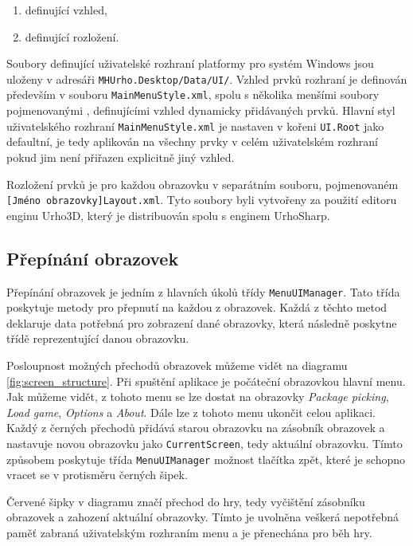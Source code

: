 \begin{enumerate}
	\item definující vzhled,
	\item definující rozložení.
\end{enumerate}

Soubory definující uživatelské rozhraní platformy pro systém Windows jsou uloženy v adresáři \texttt{MHUrho.Desktop/Data/UI/}.
Vzhled prvků rozhraní je definován především v souboru \texttt{MainMenuStyle.xml}, spolu s několika menšími soubory pojmenovanými , definujícími vzhled dynamicky přidávaných prvků. Hlavní styl uživatelského rozhraní \texttt{MainMenuStyle.xml} je nastaven v kořeni \texttt{UI.Root} jako defaultní, je tedy aplikován na všechny prvky v celém uživatelském rozhraní pokud jim není přiřazen explicitně jiný vzhled.

Rozložení prvků je pro každou obrazovku v separátním souboru, pojmenovaném \texttt{[Jméno obrazovky]Layout.xml}. Tyto soubory byli vytvořeny za použití editoru enginu Urho3D, který je distribuován spolu s enginem UrhoSharp. 

\subsection{Přepínání obrazovek}
Přepínání obrazovek je jedním z hlavních úkolů třídy \texttt{MenuUIManager}. Tato třída poskytuje metody pro přepnutí na každou z obrazovek. Každá z těchto metod deklaruje data potřebná pro zobrazení dané obrazovky, která následně poskytne třídě reprezentující danou obrazovku.

Posloupnost možných přechodů obrazovek můžeme vidět na diagramu \ref{fig:screen_structure}. Při spuštění aplikace je počáteční obrazovkou hlavní menu. Jak můžeme vidět, z tohoto menu se lze dostat na obrazovky \textit{Package picking}, \textit{Load game}, \textit{Options} a \textit{About}. Dále lze z tohoto menu ukončit celou aplikaci. Každý z černých přechodů přidává starou obrazovku na zásobník obrazovek a nastavuje novou obrazovku jako \texttt{CurrentScreen}, tedy aktuální obrazovku. Tímto způsobem poskytuje třída \texttt{MenuUIManager} možnost tlačítka zpět, které je schopno vracet se v protisměru černých šipek.

Červené šipky v diagramu značí přechod do hry, tedy vyčištění zásobníku obrazovek a zahození aktuální obrazovky. Tímto je uvolněna veškerá nepotřebná paměť zabraná uživatelským rozhraním menu a je přenechána pro běh hry.


